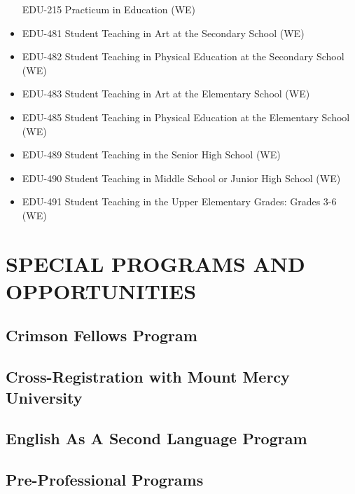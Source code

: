 \documentclass[
  letterpaper,
]{scrbook}
\begin{document}
\begin{itemize}
  EDU-215 Practicum in Education (WE)
\item
  EDU-481 Student Teaching in Art at the Secondary School (WE)
\item
  EDU-482 Student Teaching in Physical Education at the Secondary School
  (WE)
\item
  EDU-483 Student Teaching in Art at the Elementary School (WE)
\item
  EDU-485 Student Teaching in Physical Education at the Elementary
  School (WE)
\item
  EDU-489 Student Teaching in the Senior High School (WE)
\item
  EDU-490 Student Teaching in Middle School or Junior High School (WE)
\item
  EDU-491 Student Teaching in the Upper Elementary Grades: Grades 3-6
  (WE)
\end{itemize}

\hypertarget{special-programs-and-opportunities}{%
\chapter{SPECIAL PROGRAMS AND
OPPORTUNITIES}\label{special-programs-and-opportunities}}

\hypertarget{crimson-fellows-program}{%
\section{Crimson Fellows Program}\label{crimson-fellows-program}}

\hypertarget{cross-registration-with-mount-mercy-university}{%
\section{Cross-Registration with Mount Mercy
University}\label{cross-registration-with-mount-mercy-university}}

\hypertarget{english-as-a-second-language-program}{%
\section{English As A Second Language
Program}\label{english-as-a-second-language-program}}

\hypertarget{pre-professional-programs}{%
\section{Pre-Professional Programs}\label{pre-professional-programs}}
\end{document}
